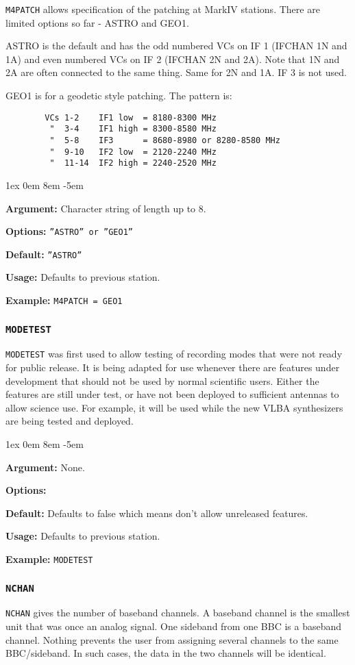 \documentclass{report}
\newcommand{\rcwbox}[5]{
  \begin{list}{}{\parsep 1ex  \itemsep 0em
                 \leftmargin 8em  \itemindent -5em }
    \item {\bf Argument:} #1
    \item {\bf Options:}  #2
    \item {\bf Default:}  #3
    \item {\bf Usage:}    #4
    \item {\bf Example:}  #5
  \end{list}
}
\begin{document}
{\tt M4PATCH} allows specification of the patching at MarkIV stations.
There are limited options so far - ASTRO and GEO1.

ASTRO is the default and has the odd numbered VCs on IF 1 (IFCHAN 1N
and 1A) and even numbered VCs on IF 2 (IFCHAN 2N and 2A).  Note that
1N and 2A are often connected to the same thing.  Same for 2N and 1A.
IF 3 is not used.

GEO1 is for a geodetic style patching. The pattern is:
\begin{verbatim}
        VCs 1-2    IF1 low  = 8180-8300 MHz
         "  3-4    IF1 high = 8300-8580 MHz
         "  5-8    IF3      = 8680-8980 or 8280-8580 MHz
         "  9-10   IF2 low  = 2120-2240 MHz
         "  11-14  IF2 high = 2240-2520 MHz
\end{verbatim}

\rcwbox
{Character string of length up to 8.}
{{\tt ''ASTRO'' or ''GEO1''}}
{{\tt ''ASTRO''}}
{Defaults to previous station.}
{{\tt M4PATCH = GEO1}}


\subsubsection{\label{SP:MODETEST}{\tt MODETEST}}

{\tt MODETEST} was first used to allow testing of recording modes
that were not ready for public release.  It is being adapted for
use whenever there are features under development that should not
be used by normal scientific users.  Either the features are still
under test, or have not been deployed to sufficient antennas to 
allow science use.  For example, it will be used while the new
VLBA synthesizers are being tested and deployed.

\rcwbox
{None.}
{}
{Defaults to false which means don't allow unreleased features.}
{Defaults to previous station.}
{{\tt MODETEST}}



\subsubsection{\label{SP:NCHAN}{\tt NCHAN}}

{\tt NCHAN} gives the number of baseband channels. A baseband channel
is the smallest unit that was once an analog signal. One sideband from
one BBC is a baseband channel. Nothing prevents the user from
assigning several channels to the same BBC/sideband. In such cases,
the data in the two channels will be identical.
\end{document}
